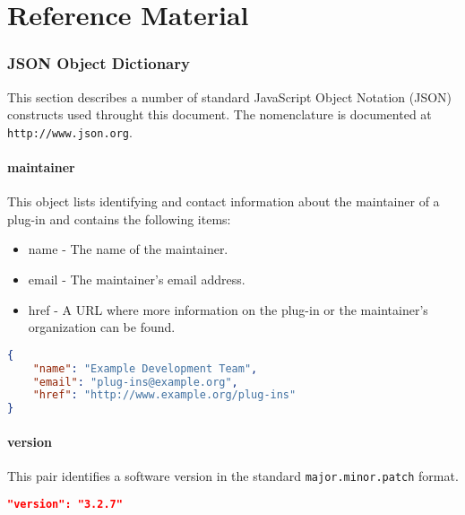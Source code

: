 \documentclass[10pt,titlepage]{article}
\begin{document}


\part{Reference Material}

\section{JSON Object Dictionary}\label{jsondict}

This section describes a number of standard JavaScript Object Notation
(JSON) constructs used throught this document.  The nomenclature
is documented at {\tt http://www.json.org}.


\subsection{maintainer}

This object lists identifying and contact information about the
maintainer of a plug-in and contains the following items:

\begin{itemize}
\item{} {\btt name} - The name of the maintainer.
\item{} {\btt email} - The maintainer's email address.
\item{} {\btt href} - A URL where more information on the plug-in or
  the maintainer's organization can be found.
\end{itemize}

\example
\begin{lstlisting}[language=json]
{
    "name": "Example Development Team",
    "email": "plug-ins@example.org",
    "href": "http://www.example.org/plug-ins"
}
\end{lstlisting}



\subsection{version}
This pair identifies a software version in the standard {\tt major.minor.patch} format.

\example
\begin{lstlisting}[language=json]
"version": "3.2.7"
\end{lstlisting}
\end{document}
